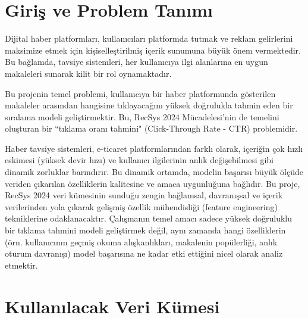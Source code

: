 \documentclass[conference]{IEEEtran}
\begin{document}
\begin{abstract}
\end{abstract}


\section{Giriş ve Problem Tanımı}
\label{sec:problem}


Dijital haber platformları, kullanıcıları platformda tutmak ve reklam gelirlerini maksimize etmek için kişiselleştirilmiş içerik sunumuna büyük önem vermektedir. Bu bağlamda, tavsiye sistemleri, her kullanıcıya ilgi alanlarına en uygun makaleleri sunarak kilit bir rol oynamaktadır.

Bu projenin temel problemi, kullanıcıya bir haber platformunda gösterilen makaleler arasından hangisine tıklayacağını yüksek doğrulukla tahmin eden bir sıralama modeli geliştirmektir. Bu, RecSys 2024 Mücadelesi'nin de temelini oluşturan bir ``tıklama oranı tahmini" (Click-Through Rate - CTR) problemidir.

Haber tavsiye sistemleri, e-ticaret platformlarından farklı olarak, içeriğin çok hızlı eskimesi (yüksek devir hızı) ve kullanıcı ilgilerinin anlık değişebilmesi gibi dinamik zorluklar barındırır. Bu dinamik ortamda, modelin başarısı büyük ölçüde veriden çıkarılan özelliklerin kalitesine ve amaca uygunluğuna bağlıdır. Bu proje, RecSys 2024 veri kümesinin sunduğu zengin bağlamsal, davranışsal ve içerik verilerinden yola çıkarak gelişmiş özellik mühendisliği (feature engineering) tekniklerine odaklanacaktır. Çalışmanın temel amacı sadece yüksek doğruluklu bir tıklama tahmini modeli geliştirmek değil, aynı zamanda hangi özelliklerin (örn. kullanıcının geçmiş okuma alışkanlıkları, makalenin popülerliği, anlık oturum davranışı) model başarısına ne kadar etki ettiğini nicel olarak analiz etmektir.


\section{Kullanılacak Veri Kümesi}
\label{sec:dataset}
\end{document}
